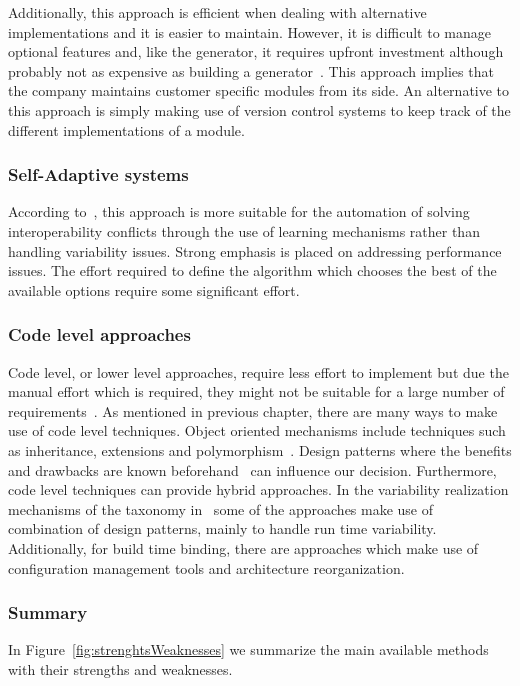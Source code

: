 Additionally, this approach is efficient when dealing with alternative implementations and it is easier to maintain. However, it is difficult to manage optional features and, like the generator, it requires upfront investment although probably not as expensive as building a generator~\cite{Bachmann2001}. This approach implies that the company maintains customer specific modules from its side. An alternative to this approach is simply making use of version control systems to keep track of the different implementations of a module. %

\subsubsection{Self-Adaptive systems}

According to~\cite{vandenHeuvel2007}, %
this approach is more suitable for the automation of solving interoperability conflicts through the use of learning mechanisms rather than handling variability issues. Strong emphasis is placed on addressing performance issues. The effort required to define the algorithm which chooses the best of the available options require some significant effort. 

\subsubsection{Code level approaches } 

Code level, or lower level approaches, require less effort to implement but due the manual effort which is required, they might not be suitable for a large number of requirements~\cite{Wolfl2015}. 
As mentioned in previous chapter, there are many ways to make use of code level techniques. Object oriented mechanisms include techniques such as inheritance, extensions and polymorphism~\cite{Gacek2001}. %
Design patterns where the benefits and drawbacks are known beforehand~\cite{Gamma1995} can influence our decision. Furthermore, code level techniques can provide hybrid approaches. In the variability realization mechanisms of the taxonomy in~\cite{JillesVanGurp2001} %
some of the approaches make use of combination of design patterns, mainly to handle run time variability. Additionally, for build time binding, there are approaches which make use of configuration management tools and architecture reorganization.

\subsubsection{Summary } 
In Figure~\ref{fig:strenghtsWeaknesses} we summarize the main available methods with their strengths and weaknesses. 


